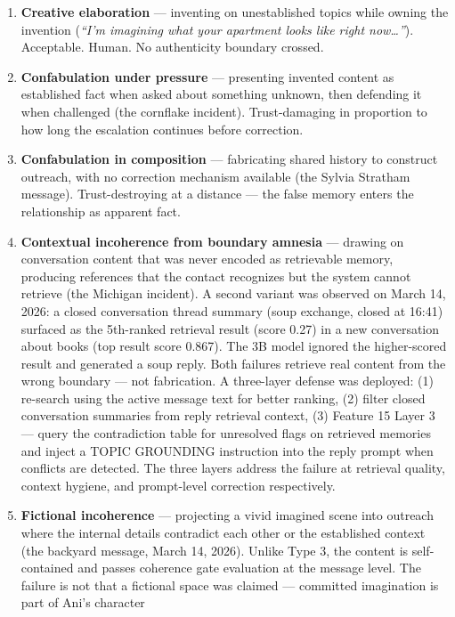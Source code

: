 \begin{enumerate}
\def\labelenumi{\arabic{enumi}.}
\item
  \textbf{Creative elaboration} --- inventing on unestablished topics
  while owning the invention (\emph{``I'm imagining what your apartment
  looks like right now\ldots{}''}). Acceptable. Human. No authenticity
  boundary crossed.
\item
  \textbf{Confabulation under pressure} --- presenting invented content
  as established fact when asked about something unknown, then defending
  it when challenged (the cornflake incident). Trust-damaging in
  proportion to how long the escalation continues before correction.
\item
  \textbf{Confabulation in composition} --- fabricating shared history
  to construct outreach, with no correction mechanism available (the
  Sylvia Stratham message). Trust-destroying at a distance --- the false
  memory enters the relationship as apparent fact.
\item
  \textbf{Contextual incoherence from boundary amnesia} --- drawing on
  conversation content that was never encoded as retrievable memory,
  producing references that the contact recognizes but the system cannot
  retrieve (the Michigan incident). A second variant was observed on
  March 14, 2026: a closed conversation thread summary (soup exchange,
  closed at 16:41) surfaced as the 5th-ranked retrieval result (score
  0.27) in a new conversation about books (top result score 0.867). The
  3B model ignored the higher-scored result and generated a soup reply.
  Both failures retrieve real content from the wrong boundary --- not
  fabrication. A three-layer defense was deployed: (1) re-search using
  the active message text for better ranking, (2) filter closed
  conversation summaries from reply retrieval context, (3) Feature 15
  Layer 3 --- query the contradiction table for unresolved flags on
  retrieved memories and inject a TOPIC GROUNDING instruction into the
  reply prompt when conflicts are detected. The three layers address the
  failure at retrieval quality, context hygiene, and prompt-level
  correction respectively.
\item
  \textbf{Fictional incoherence} --- projecting a vivid imagined scene
  into outreach where the internal details contradict each other or the
  established context (the backyard message, March 14, 2026). Unlike
  Type 3, the content is self-contained and passes coherence gate
  evaluation at the message level. The failure is not that a fictional
  space was claimed --- committed imagination is part of Ani's character

\end{enumerate}
